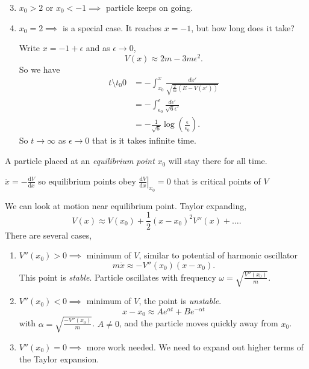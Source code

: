 \begin{enumerate}
    \setcounter{enumi}{2}
    \item \(x_0 > 2 \text{ or } x_0 < -1 \implies \) particle keeps on going.
    \item \(x_0 = 2 \implies\) is a special case. It reaches \(x = -1\), but how long does it take?
    
    Write \(x = -1 + \epsilon\) and as \(\epsilon \to 0\),
    \[
        V(x) \approx 2m - 3m \epsilon^2.
    \]
    So we have
    \begin{align*}
        t \setminus  t_0 0&= - \int_{x_0}^x \frac{dx'}{\sqrt{\frac{2}{m}(E-V(x'))} }\\
        &=-\int_{\epsilon_0}^\epsilon \frac{d\epsilon'}{\sqrt{6}\epsilon'}\\
        &= -\frac{1}{\sqrt{6} }\log (\frac{\epsilon}{\epsilon_0}).
    \end{align*}
    So \(t \to \infty\) as \(\epsilon \to 0\) that is it takes infinite time.
\end{enumerate}
\begin{definition}
    A particle placed at an \textit{equilibrium point} \(x_0\) will stay there for all time.

    \(\ddot{x}=-\frac{\mathrm{d}V}{\mathrm{d}x}\) so equilibrium points obey \(\left.\frac{\mathrm{d}V}{\mathrm{d}x} \right|_{x_0} = 0\) that is critical points of \(V\)
\end{definition}

We can look at motion near equilibrium point. Taylor expanding,
\[
    V(x) \approx V(x_0) + \frac{1}{2}(x-x_0)^{2}V''(x) + \ldots.
\]
There are several cases,
\begin{enumerate}
    \item \(V''(x_0) > 0 \implies \) minimum of \(V\), similar to potential of harmonic oscillator
    \[
        m\ddot{x} \approx -V''(x_0)(x-x_0).
    \]
    This point is \textit{stable}. Particle oscillates with frequency \(\omega = \sqrt{\frac{V''(x_0)}{m}} \).
    \item \(V''(x_0) < 0 \implies \) minimum of \(V\), the point is \textit{unstable}.
    \[
    x - x_0 \approx Ae^{\alpha t} + B e^{-\alpha t}
    \]
    with \(\alpha = \sqrt{\frac{-V''(x_0)}{m}} \).
    \(A \neq 0\), and the particle moves quickly away from \(x_0\).
    \item \(V''(x_0) = 0\implies\) more work needed. We need to expand out higher terms of the Taylor expansion.
\end{enumerate}

